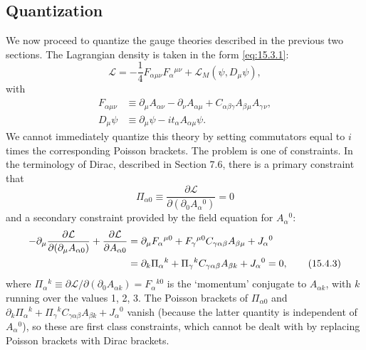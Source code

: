 
\subsection{Quantization}

We now proceed to quantize the gauge theories described in the previous two
sections. The Lagrangian density is taken in the form \eqref{eq:15.3.1}:
\begin{equation}
  \mathcal L=-\frac14 F_{\alpha\mu\nu}F_\alpha{}^{\mu\nu}
  +\mathcal L_M(\psi,D_\mu\psi),
  \tag{15.4.1}\label{eq:15.4.1}
\end{equation}
with
\begin{align*}
  F_{\alpha\mu\nu}&\equiv\partial_\mu A_{\alpha\nu}
  -\partial_\nu A_{\alpha\mu}+C_{\alpha\beta\gamma}
  A_\beta{}_{\mu}A_\gamma{}_{\nu},\\
  D_\mu\psi&\equiv\partial_\mu\psi-it_\alpha A_{\alpha\mu}\psi.
\end{align*}
We cannot immediately quantize this theory by setting commutators equal to
$i$ times the corresponding Poisson brackets. The problem is one of
constraints. In the terminology of Dirac, described in Section 7.6, there is
a primary constraint that
\begin{equation}
  \Pi_{\alpha0}\equiv\frac{\partial\mathcal L}
  {\partial(\partial_0A_\alpha{}^0)}=0
  \tag{15.4.2}\label{eq:15.4.2}
\end{equation}
and a secondary constraint provided by the field equation for $A_\alpha{}^0$:
\begin{align}
  -\partial_\mu\frac{\partial\mathcal L}
  {\partial(\partial_\mu A_{\alpha0})}
  +\frac{\partial\mathcal L}{\partial A_{\alpha0}}
  &=\partial_\mu F_\alpha{}^{\mu0}
  +F_\gamma{}^{\mu0}C_{\gamma\alpha\beta}A_{\beta\mu}+J_\alpha{}^0
  \notag\\
  &=\partial_k\Pi_\alpha{}^k
  +\Pi_\gamma{}^k C_{\gamma\alpha\beta}A_{\beta k}+J_\alpha{}^0=0,
  \tag{15.4.3}\label{eq:15.4.3}
\end{align}
where $\Pi_\alpha{}^k\equiv\partial\mathcal L/
\partial(\partial_0A_{\alpha k})=F_\alpha{}^{k0}$ is the `momentum'
conjugate to $A_{\alpha k}$, with $k$ running over the values 1, 2, 3. The
Poisson brackets of $\Pi_{\alpha0}$ and
$\partial_k\Pi_\alpha{}^k+\Pi_\gamma{}^kC_{\gamma\alpha\beta}A_{\beta k}
+J_\alpha{}^0$ vanish (because the latter quantity is independent of
$A_\alpha{}^0$), so these are first class constraints, which cannot be dealt
with by replacing Poisson brackets with Dirac brackets.


